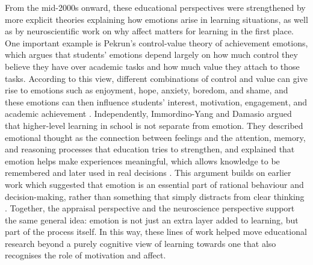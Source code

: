 From the mid-2000s onward, these educational perspectives were strengthened by more explicit theories explaining how emotions arise in learning situations, as well as by neuroscientific work on why affect matters for learning in the first place. One important example is Pekrun's control-value theory of achievement emotions, which argues that students' emotions depend largely on how much control they believe they have over academic tasks and how much value they attach to those tasks. According to this view, different combinations of control and value can give rise to emotions such as enjoyment, hope, anxiety, boredom, and shame, and these emotions can then influence students' interest, motivation, engagement, and academic achievement \cite{pekrun_control-value_2006}. Independently, Immordino-Yang and Damasio argued that higher-level learning in school is not separate from emotion. They described emotional thought as the connection between feelings and the attention, memory, and reasoning processes that education tries to strengthen, and explained that emotion helps make experiences meaningful, which allows knowledge to be remembered and later used in real decisions \cite{immordino-yang_we_2007}. This argument builds on earlier work which suggested that emotion is an essential part of rational behaviour and decision-making, rather than something that simply distracts from clear thinking \cite{damasio1994descartes}. Together, the appraisal perspective and the neuroscience perspective support the same general idea: emotion is not just an extra layer added to learning, but part of the process itself. In this way, these lines of work helped move educational research beyond a purely cognitive view of learning towards one that also recognises the role of motivation and affect.

